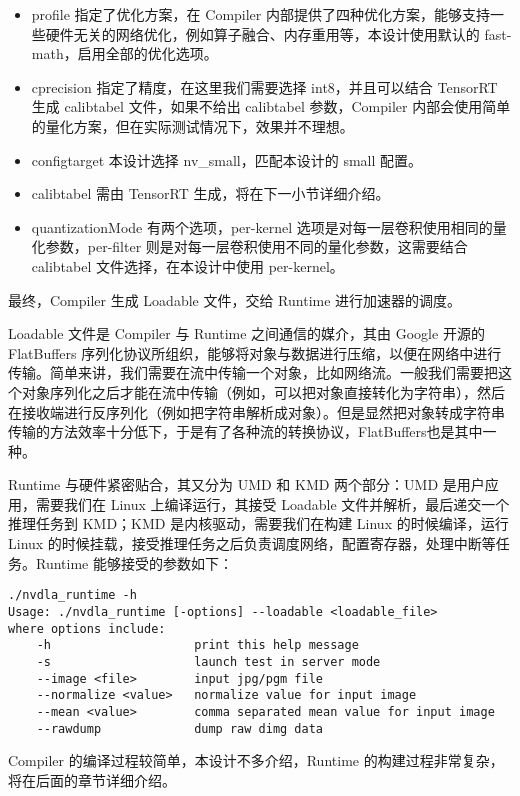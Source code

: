 \begin{itemize}
    \item profile 指定了优化方案，在 Compiler 内部提供了四种优化方案，能够支持一些硬件无关的网络优化，例如算子融合、内存重用等，本设计使用默认的 fast-math，启用全部的优化选项。
    \item cprecision 指定了精度，在这里我们需要选择 int8，并且可以结合 TensorRT 生成 calibtabel 文件，如果不给出 calibtabel 参数，Compiler 内部会使用简单的量化方案，但在实际测试情况下，效果并不理想。
    \item configtarget 本设计选择 nv\_small，匹配本设计的 small 配置。
    \item calibtabel 需由 TensorRT 生成，将在下一小节详细介绍。
    \item quantizationMode 有两个选项，per-kernel 选项是对每一层卷积使用相同的量化参数，per-filter 则是对每一层卷积使用不同的量化参数，这需要结合 calibtabel 文件选择，在本设计中使用 per-kernel。
\end{itemize}

最终，Compiler 生成 Loadable 文件，交给 Runtime 进行加速器的调度。

Loadable 文件是 Compiler 与 Runtime 之间通信的媒介，其由 Google 开源的 FlatBuffers 序列化协议所组织，能够将对象与数据进行压缩，以便在网络中进行传输。简单来讲，我们需要在流中传输一个对象，比如网络流。一般我们需要把这个对象序列化之后才能在流中传输（例如，可以把对象直接转化为字符串），然后在接收端进行反序列化（例如把字符串解析成对象）。但是显然把对象转成字符串传输的方法效率十分低下，于是有了各种流的转换协议，FlatBuffers也是其中一种。

Runtime 与硬件紧密贴合，其又分为 UMD 和 KMD 两个部分：UMD 是用户应用，需要我们在 Linux 上编译运行，其接受 Loadable 文件并解析，最后递交一个推理任务到 KMD；KMD 是内核驱动，需要我们在构建 Linux 的时候编译，运行 Linux 的时候挂载，接受推理任务之后负责调度网络，配置寄存器，处理中断等任务。Runtime 能够接受的参数如下：

\begin{lstlisting}
./nvdla_runtime -h
Usage: ./nvdla_runtime [-options] --loadable <loadable_file>
where options include:
    -h                    print this help message
    -s                    launch test in server mode
    --image <file>        input jpg/pgm file
    --normalize <value>   normalize value for input image
    --mean <value>        comma separated mean value for input image
    --rawdump             dump raw dimg data
\end{lstlisting}

Compiler 的编译过程较简单，本设计不多介绍，Runtime 的构建过程非常复杂，将在后面的章节详细介绍。

